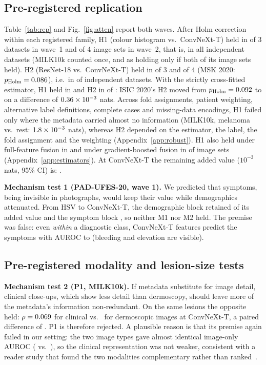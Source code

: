\documentclass[conference]{IEEEtran}
\begin{document}
\subsection{Pre-registered replication}\label{sec:rep}

Table~\ref{tab:rep} and Fig.~\ref{fig:atten} report both waves. After Holm correction within each registered family, H1 (colour histogram vs.\ ConvNeXt-T) held in \REPwaveOneHone{} of 3 datasets in wave~1 and \REPwaveTwoHone{} of 4 image sets in wave~2, that is, in all \REPindepHone{} independent datasets (MILK10k counted once, and as holding only if both of its image sets held). H2 (ResNet-18 vs.\ ConvNeXt-T) held in \REPwaveOneHtwo{} of 3 and \REPwaveTwoHtwo{} of 4 (MSK 2020: $p_{\mathrm{Holm}}=0.086$), i.e.\ in \REPindepHtwo{} of \REPindepN{} independent datasets. With the strictly cross-fitted estimator, H1 held in \ESTindepHone{} and H2 in \ESTindepHtwo{} of \REPindepN{}: ISIC 2020's H2 moved from $p_{\mathrm{Holm}}=0.092$ to \ESTisicHtwoCorr{} on a difference of $0.36\times10^{-3}$ nats. Across fold assignments, patient weighting, alternative label definitions, complete cases and missing-data encodings, H1 failed only where the metadata carried almost no information (MILK10k, melanoma vs.\ rest: $1.8\times10^{-3}$ nats), whereas H2 depended on the estimator, the label, the fold assignment and the weighting (Appendix~\ref{app:robust}). H1 also held under full-feature fusion in \ESThOneB{} and under gradient-boosted fusion in \ESThOneC{} of \ESTnSets{} image sets (Appendix~\ref{app:estimators}). At ConvNeXt-T the remaining added value ($10^{-3}$ nats, 95\% CI) is: \REPfloors{}.

\textbf{Mechanism test 1 (PAD-UFES-20, wave 1).} We predicted that symptoms, being invisible in photographs, would keep their value while demographics attenuated. From HSV to ConvNeXt-T, the demographic block retained \PADmechD{} of its added value and the symptom block \PADmechS{}, so neither M1 nor M2 held. The premise was false: even \emph{within} a diagnostic class, ConvNeXt-T features predict the symptoms with AUROC \PADsymWithinMin{} to \PADsymWithinMax{} (bleeding and elevation are visible).

\subsection{Pre-registered modality and lesion-size tests}\label{sec:p1}
\textbf{Mechanism test 2 (P1, MILK10k).} If metadata substitute for image detail, clinical close-ups, which show less detail than dermoscopy, should leave more of the metadata's information non-redundant. On the same \PoneN{} lesions the opposite held: $\rho=0.069$ for clinical vs.\ \PoneRhoDerm{} for dermoscopic images at ConvNeXt-T, a paired difference of \PoneDiff{} \PoneCI{}. P1 is therefore rejected. A plausible reason is that its premise again failed in our setting: the two image types gave almost identical image-only AUROC (\MILKaucClin{} vs.\ \MILKaucDerm{}), so the clinical representation was not weaker, consistent with a reader study that found the two modalities complementary rather than ranked~\cite{muller2026milk}.
\end{document}

